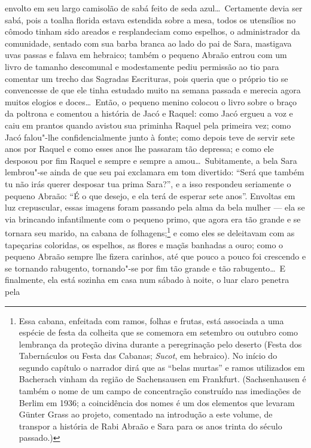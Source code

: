 envolto em seu largo camisolão de sabá feito de seda azul\ldots\ Certamente
devia ser sabá, pois a toalha florida estava estendida sobre a mesa,
todos os utensílios no cômodo tinham sido areados e resplandeciam como
espelhos, o administrador da comunidade, sentado com sua barba branca
ao lado do pai de Sara, mastigava uvas passas e falava em hebraico;
também o pequeno Abraão entrou com um livro de tamanho descomunal e
modestamente pediu permissão ao tio para comentar um trecho das
Sagradas Escrituras, pois queria que o próprio tio se convencesse de
que ele tinha estudado muito na semana passada e merecia agora muitos
elogios e doces\ldots\ Então, o pequeno menino colocou o livro sobre o
braço da poltrona e comentou a história de Jacó e Raquel: como Jacó
ergueu a voz e caiu em prantos quando avistou sua priminha Raquel pela
primeira vez; como Jacó falou"-lhe confidencialmente junto à fonte;
como depois teve de servir sete anos por Raquel e como esses anos lhe
passaram tão depressa; e como ele desposou por fim Raquel e sempre e
sempre a amou\ldots\ Subitamente, a bela Sara lembrou"-se ainda de que seu
pai exclamara em tom divertido: ``Será que também tu não irás querer
desposar tua prima Sara?'', e a isso respondeu seriamente o pequeno
Abraão: ``É o que desejo, e ela terá de esperar sete anos''. Envoltas em
luz crepuscular, essas imagens foram passando pela alma da bela mulher
--- ela se via brincando infantilmente com o pequeno primo, que agora era
tão grande e se tornara seu marido, na cabana de
folhagens;\footnote{ Essa
cabana, enfeitada com ramos, folhas e frutas, está associada a uma
espécie de festa da colheita que se comemora em setembro ou outubro
como lembrança da proteção divina durante a peregrinação pelo deserto
(Festa dos Tabernáculos ou Festa das Cabanas; \textit{Sucot}, em
hebraico). No início do segundo capítulo o narrador dirá que as ``belas
murtas'' e ramos utilizados em Bacherach vinham da região de
Sachensausen em Frankfurt. (Sachsenhausen é também o nome de um campo
de concentração construído nas imediações de Berlim em 1936; a
coincidência dos nomes é um dos elementos que levaram Günter Grass ao
projeto, comentado na introdução a este volume, de transpor a história
de Rabi Abraão e Sara para os anos trinta do século passado.)}
e como eles se deleitavam com as tapeçarias coloridas, os espelhos, as
flores e maçãs banhadas a ouro; como o pequeno Abraão sempre lhe fizera
carinhos, até que pouco a pouco foi crescendo e se tornando rabugento,
tornando"-se por fim tão grande e tão rabugento\ldots\ E finalmente, ela
está sozinha em casa num sábado à noite, o luar claro penetra pela
